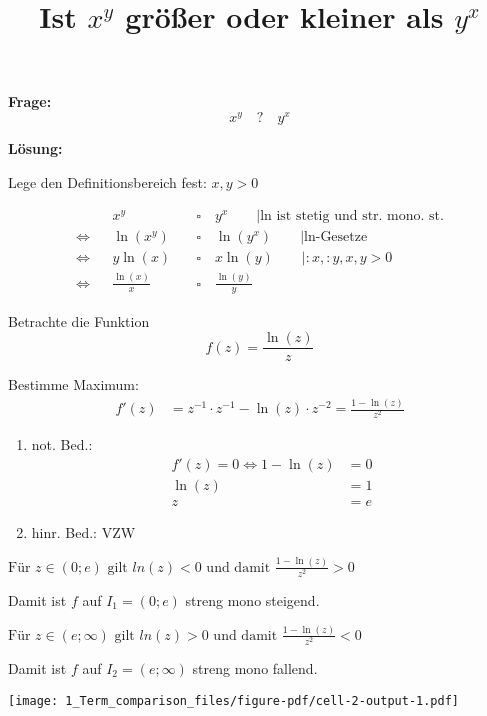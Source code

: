 \documentclass[
  11pt,
  a4paper,
  DIV=11,
  numbers=noendperiod]{scrartcl}
\title{Ist \(x^y\) größer oder kleiner als \(y^x\)}
\author{}
\date{}
\begin{document}
\maketitle

\textbf{Frage:} \[x^y \quad ? \quad y^x\]

\textbf{Lösung:}

Lege den Definitionsbereich fest: \(x,y>0\)

\[
\begin{aligned}
&& x^y & \quad\square\quad  y^x \qquad |\text{ln ist stetig und str. mono. st.}\\
\Leftrightarrow&& \ln(x^y) & \quad\square\quad \ln(y^x)\qquad |\text{ln-Gesetze}\\
\Leftrightarrow&& y \ln(x) & \quad\square\quad x\ln(y)\qquad |:x, :y, x, y > 0\\
\Leftrightarrow&& \frac{\ln(x)}{x }& \quad\square\quad \frac{\ln(y)}{y}
\end{aligned}
\]

Betrachte die Funktion \[
f(z)=\frac{\ln(z)}{z}
\]

Bestimme Maximum:\\
\[
\begin{aligned}
f'(z)& = z^{-1}\cdot z^{-1} - \ln(z)\cdot z^{-2} = \frac{1-\ln(z)}{z^2}
\end{aligned}
\]

\begin{enumerate}
\def\labelenumi{\arabic{enumi}.}
\item
  not. Bed.:\\
  \[
  \begin{aligned}
  f'(z)=0 \Leftrightarrow 1-\ln(z)&=0\\
  \ln(z) &= 1\\
  z & = e
  \end{aligned}
  \]
\item
  hinr. Bed.: VZW
\end{enumerate}

\(\text{Für }z \in (0; e) \text{ gilt } ln(z)<0 \text{ und damit } \frac{1-\ln(z)}{z^2}>0\)

Damit ist \(f\) auf \(I_1=(0; e)\) streng mono steigend.

\(\text{Für }z \in (e; \infty) \text{ gilt } ln(z)>0 \text{ und damit }\frac{1-\ln(z)}{z^2}<0\)

Damit ist \(f\) auf \(I_2=(e; \infty)\) streng mono fallend.

\texttt{[image: 1\_Term\_comparison\_files/figure-pdf/cell-2-output-1.pdf]}
\end{document}
